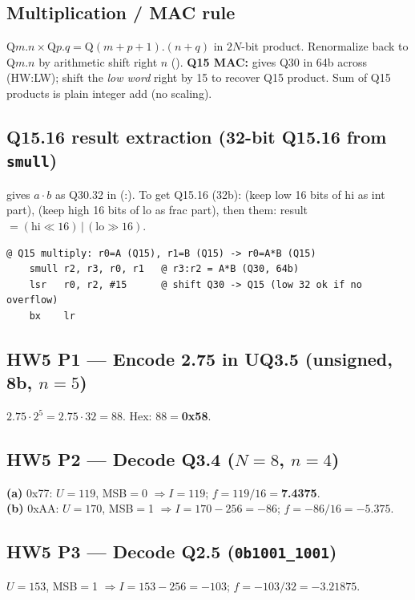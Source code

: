 \subsection{Multiplication / MAC rule}
$\text{Q}m.n \times \text{Q}p.q = \text{Q}(m{+}p{+}1).(n{+}q)$ in $2N$-bit product.
Renormalize back to Q$m.n$ by arithmetic shift right $n$ ().
\textbf{Q15 MAC:}  gives Q30 in 64b across (HW:LW); shift the
\emph{low word} right by 15 to recover Q15 product. Sum of Q15 products is
plain integer add (no scaling).

\subsection{Q15.16 result extraction (32-bit Q15.16 from \texttt{smull})}
 gives $a\cdot b$ as Q30.32 in (:).
To get Q15.16 (32b):  (keep low 16 bits of hi as int part),
 (keep high 16 bits of lo as frac part), then
 them: result $= (\text{hi}\!\ll\!16)\,|\,(\text{lo}\!\gg\!16)$.

\begin{lstlisting}
@ Q15 multiply: r0=A (Q15), r1=B (Q15) -> r0=A*B (Q15)
    smull r2, r3, r0, r1   @ r3:r2 = A*B (Q30, 64b)
    lsr   r0, r2, #15      @ shift Q30 -> Q15 (low 32 ok if no overflow)
    bx    lr
\end{lstlisting}

\subsection{HW5 P1 --- Encode 2.75 in UQ3.5 (unsigned, 8b, $n{=}5$)}
\begin{hwp}
$2.75\cdot 2^{5}=2.75\cdot 32 = 88$. Hex: $88=$\textbf{0x58}.
\end{hwp}

\subsection{HW5 P2 --- Decode Q3.4 ($N{=}8$, $n{=}4$)}
\begin{hwp}
\textbf{(a)} 0x77: $U{=}119$, MSB$=$0 $\Rightarrow I{=}119$;
$f=119/16=$\textbf{7.4375}.\\
\textbf{(b)} 0xAA: $U{=}170$, MSB$=$1 $\Rightarrow I=170-256=-86$;
$f=-86/16=$\textbf{$-5.375$}.
\end{hwp}

\subsection{HW5 P3 --- Decode Q2.5 (\texttt{0b1001\_1001})}
\begin{hwp}
$U{=}153$, MSB$=$1 $\Rightarrow I=153-256=-103$;
$f=-103/32=$\textbf{$-3.21875$}.
\end{hwp}


